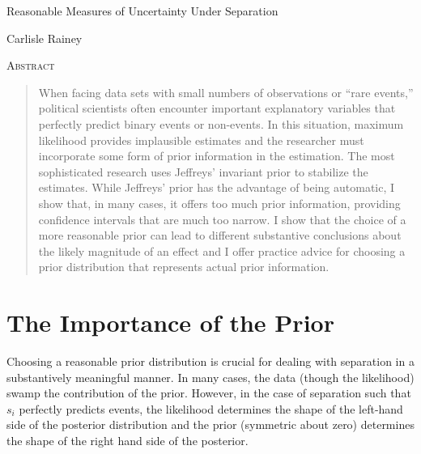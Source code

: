 \documentclass[12pt]{article}
\begin{document}
\begin{center}
{\LARGE Reasonable Measures of Uncertainty Under Separation}

\vspace{10mm}

Carlisle Rainey

\end{center}

\thispagestyle{empty}

\vspace{10mm}
{\centerline{\textsc{Abstract}}}
\begin{quote}\noindent When facing data sets with small numbers of observations or ``rare events,'' political scientists often encounter important explanatory variables that perfectly predict binary events or non-events. In this situation, maximum likelihood provides implausible estimates and the researcher must incorporate some form of prior information in the estimation. The most sophisticated research uses Jeffreys' invariant prior to stabilize the estimates. While Jeffreys' prior has the advantage of being automatic, I show that, in many cases, it offers too much prior information, providing confidence intervals that are much too narrow. I show that the choice of a more reasonable prior can lead to different substantive conclusions about the likely magnitude of an effect and I offer practice advice for choosing a prior distribution that represents actual prior information.\end{quote}


\newpage
\doublespace

\section*{The Importance of the Prior}

Choosing a reasonable prior distribution is crucial for dealing with separation in a substantively meaningful manner. In many cases, the data (though the likelihood) swamp the contribution of the prior. However, in the case of separation such that $s_i$ perfectly predicts events, the likelihood determines the shape of the left-hand side of the posterior distribution and the prior (symmetric about zero) determines the shape of the right hand side of the posterior.
\end{document}
